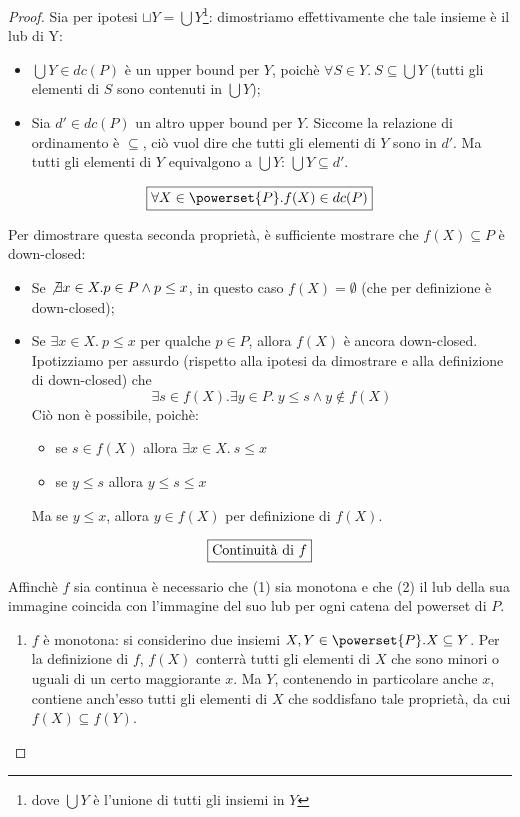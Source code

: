 \begin{proof}
Sia per ipotesi $\sqcup Y = \bigcup Y$\footnote{dove $\bigcup Y$ è l'unione di
tutti gli insiemi in $Y$}: dimostriamo effettivamente che tale insieme è il lub
di Y:
\begin{itemize}
  \item $\bigcup Y \in dc(P)$ è un upper bound per $Y$, poichè
    $\forall{S}\in Y.\ S \subseteq \bigcup Y$ (tutti gli elementi di $S$ sono
    contenuti in $\bigcup Y$);
  \item Sia $d'\in dc(P)$ un altro upper bound per $Y$. Siccome la relazione di
    ordinamento è $\subseteq$, ciò vuol dire che tutti gli elementi di $Y$ sono
    in $d'$. Ma tutti gli elementi di $Y$ equivalgono a $\bigcup Y$:
    $\bigcup Y \subseteq d'$.
\end{itemize}

$$
\boxer{\forall{X} \in \powerset{P}. f(X) \in dc(P)}
$$

Per dimostrare questa seconda proprietà, è sufficiente mostrare che
$f(X) \subseteq P$ è down-closed:

\begin{itemize}
  \item Se $\not \exists{x}\in X. p\in P \land p \leq x$, in
    questo caso $f(X) = \emptyset$ (che per definizione è down-closed);
  \item Se $\exists{x}\in X.\ p \leq x$ per qualche $p \in P$, allora $f(X)$ è
    ancora down-closed. Ipotizziamo per assurdo (rispetto alla ipotesi da
    dimostrare e alla definizione di down-closed) che
    $$
    \exists{s\in f(X)}.\exists{y}\in P.\ y \leq s \land y \not \in f(X)
    $$
    Ciò non è possibile, poichè:
    \begin{itemize}
      \item se $s \in f(X)$ allora $\exists{x}\in X.\ s \leq x$
      \item se $y \leq s$ allora $y \leq s \leq x$
    \end{itemize}
    Ma se $y \leq x$, allora $y \in f(X)$ per definizione di $f(X)$.
\end{itemize}

$$
\boxed{\text{Continuità di } f}
$$

Affinchè $f$ sia continua è necessario che (1) sia monotona e che (2) il lub
della sua immagine coincida con l'immagine del suo lub per ogni catena del
powerset di $P$.

\begin{enumerate}
  \item $f$ è monotona: si considerino due insiemi
    $X,Y\in \powerset{P}. X \subseteq Y$. Per la definizione di $f$, $f(X)$ conterrà
    tutti gli elementi di $X$ che sono minori o uguali di un certo maggiorante
    $x$.
    Ma $Y$, contenendo in particolare anche $x$, contiene anch'esso tutti gli
    elementi di $X$ che soddisfano tale proprietà, da cui
    $f(X) \subseteq f(Y)$.


\end{enumerate}
\end{proof}
